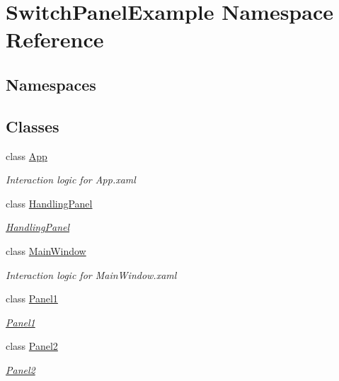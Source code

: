 \hypertarget{namespace_switch_panel_example}{}\section{Switch\+Panel\+Example Namespace Reference}
\label{namespace_switch_panel_example}
\subsection*{Namespaces}
\begin{DoxyCompactItemize}
\end{DoxyCompactItemize}
\subsection*{Classes}
\begin{DoxyCompactItemize}
\item 
class \mbox{\hyperlink{class_switch_panel_example_1_1_app}{App}}
\begin{DoxyCompactList}\small\item\em Interaction logic for App.\+xaml \end{DoxyCompactList}\item 
class \mbox{\hyperlink{class_switch_panel_example_1_1_handling_panel}{Handling\+Panel}}
\begin{DoxyCompactList}\small\item\em \mbox{\hyperlink{class_switch_panel_example_1_1_handling_panel}{Handling\+Panel}} \end{DoxyCompactList}\item 
class \mbox{\hyperlink{class_switch_panel_example_1_1_main_window}{Main\+Window}}
\begin{DoxyCompactList}\small\item\em Interaction logic for Main\+Window.\+xaml \end{DoxyCompactList}\item 
class \mbox{\hyperlink{class_switch_panel_example_1_1_panel1}{Panel1}}
\begin{DoxyCompactList}\small\item\em \mbox{\hyperlink{class_switch_panel_example_1_1_panel1}{Panel1}} \end{DoxyCompactList}\item 
class \mbox{\hyperlink{class_switch_panel_example_1_1_panel2}{Panel2}}
\begin{DoxyCompactList}\small\item\em \mbox{\hyperlink{class_switch_panel_example_1_1_panel2}{Panel2}} \end{DoxyCompactList}\end{DoxyCompactItemize}
